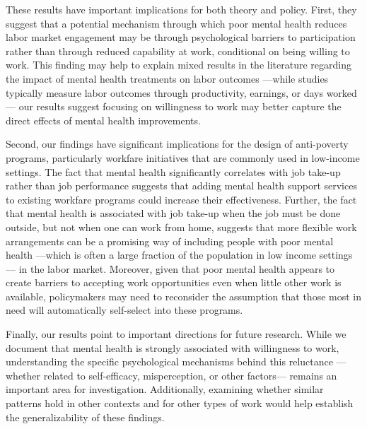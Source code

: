 \documentclass[12pt, a4paper, american]{article}
\begin{document}
These results have important implications for both theory and policy. First, they suggest that a potential mechanism through which poor mental health reduces labor market engagement may be through psychological barriers to participation rather than through reduced capability at work, conditional on being willing to work. This finding may help to explain mixed results in the literature regarding the impact of mental health treatments on labor outcomes ---while studies typically measure labor outcomes through productivity, earnings, or days worked--- our results suggest focusing on willingness to work may better capture the direct effects of mental health improvements.

Second, our findings have significant implications for the design of anti-poverty programs, particularly workfare initiatives that are commonly used in low-income settings. The fact that mental health significantly correlates with job take-up rather than job performance suggests that adding mental health support services to existing workfare programs could increase their effectiveness. Further, the fact that mental health is associated with job take-up when the job must be done outside, but not when one can work from home, suggests that more flexible work arrangements can be a promising way of including people with poor mental health ---which is often a large fraction of the population in low income settings--- in the labor market. Moreover, given that poor mental health appears to create barriers to accepting work opportunities even when little other work is available, policymakers may need to reconsider the assumption that those most in need will automatically self-select into these programs.

Finally, our results point to important directions for future research. While we document that mental health is strongly associated with willingness to work, understanding the specific psychological mechanisms behind this reluctance ---whether related to self-efficacy, misperception, or other factors--- remains an important area for investigation. Additionally, examining whether similar patterns hold in other contexts and for other types of work would help establish the generalizability of these findings.



\clearpage


\end{document}
